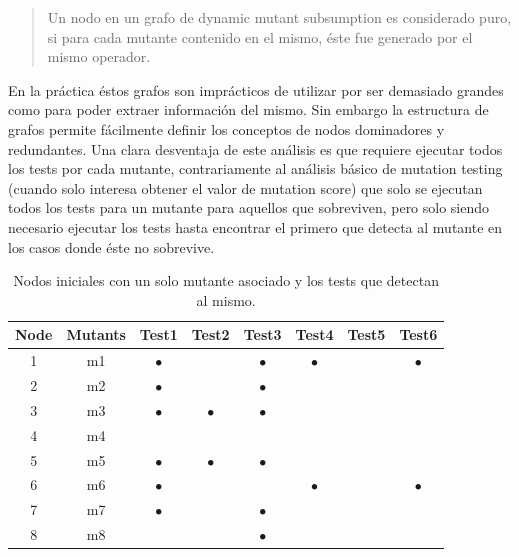 \begin{quote}
	Un nodo en un grafo de dynamic mutant subsumption es considerado puro, si para cada mutante contenido en el mismo, \'este fue generado por el mismo operador.
\end{quote}
En la pr\'actica \'estos grafos son impr\'acticos de utilizar por ser demasiado grandes como para poder extraer informaci\'on del mismo. Sin embargo la estructura de grafos permite f\'acilmente definir los conceptos de nodos dominadores y redundantes.
Una clara desventaja de este an\'alisis es que requiere ejecutar todos los tests por cada mutante, contrariamente al an\'alisis b\'asico de mutation testing (cuando solo interesa obtener el valor de mutation score) que solo se ejecutan todos los tests para un mutante para aquellos que sobreviven, pero solo siendo necesario ejecutar los tests hasta encontrar el primero que detecta al mutante en los casos donde \'este no sobrevive.

\begin{table}[]
	\caption[Ejemplo subsunci\'on, matriz de detecci\'on]{Nodos iniciales con un solo mutante asociado y los tests que detectan al mismo.}
	\label{tables.examples.subsumptionInit}
	\centering
	\begin{tabular}{|cccccccc|}
		\hline
		Node & Mutants & Test1 & Test2 & Test3 & Test4 & Test5 & Test6 \\ \hline
		1 & m1 & $\bullet$ &  & $\bullet$ & $\bullet$ &  & $\bullet$ \\ \hline
		2 & m2 & $\bullet$ &  & $\bullet$ &  &  &  \\ \hline
		3 & m3 & $\bullet$ & $\bullet$ & $\bullet$ &  &  &  \\ \hline
		4 & m4 &  &  &  &  &  &  \\ \hline
		5 & m5 & $\bullet$ & $\bullet$ & $\bullet$ &  &  &  \\ \hline
		6 & m6 & $\bullet$ &  &  & $\bullet$ &  & $\bullet$ \\ \hline
		7 & m7 & $\bullet$ &  & $\bullet$ &  &  &  \\ \hline
		8 & m8 &  &  & $\bullet$ &  &  &  \\ \hline
	\end{tabular}
\end{table}

